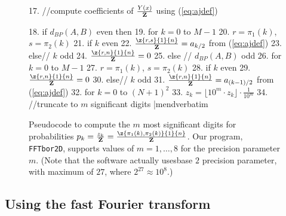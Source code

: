 \begin{figure}[!h]
\begin{small}
17. //compute coefficients of $\frac{Y(x)}{{\bf Z}}$ using (\ref{eq:ajdef})


18. if $d_{BP}(A,B)$ even then
19.   for $k=0$ to $M-1$
20.     $r=\pi_1(k)$, $s=\pi_2(k)$
21.     if $k$ even
22.       $\frac{\z{r,s}{1}{n}}{{\bf Z}} = a_{k/2}$ from (\ref{eq:ajdef})
23.     else// $k$ odd
24.       $\frac{\z{r,n}{1}{n}}{{\bf Z}} = 0$
25. else // $d_{BP}(A,B)$ odd
26.   for $k=0$ to $M-1$
27.     $r=\pi_1(k)$, $s=\pi_2(k)$
28.     if $k$ even
29.       $\frac{\z{r,n}{1}{n}}{{\bf Z}} = 0$
30.     else// $k$ odd
31.       $\frac{\z{r,n}{1}{n}}{{\bf Z}} = a_{(k-1)/2}$ from (\ref{eq:ajdef})
32.  for $k=0$ to $(N+1)^2$
33.    $z_k = \lfloor 10^m \cdot z_k \rfloor \cdot \frac{1}{10^m}$
34.    //truncate to $m$ significant digits
|mendverbatim
\end{small}
\caption{\small
Pseudocode to compute the $m$ most significant digits
for probabilities
$p_k = \frac{z_{k}}{{\bf Z}}=\frac{\z{\pi_1(k),\pi_2(k)}{1}{n}}{{\bf Z}}$.
Our program, {\tt FFTbor2D}, supports values of $m = 1,\ldots,8$ for the
precision parameter $m$.
(Note that the software actually usesbase $2$ precision parameter, with maximum of $27$, where $2^{27} \approx
10^8$.)
}
\label{pseudocode:interpolatingP}
\end{figure}


\subsection{Using the fast Fourier transform}
\label{section:FFT}

